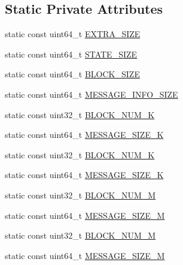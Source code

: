 \subsection*{Static Private Attributes}
\begin{DoxyCompactItemize}
\item 
static const uint64\-\_\-t \hyperlink{classapollo_1_1cyber_1_1transport_1_1ShmConf_a2b9bcde16fdd2a69d5743551584a8e1e}{E\-X\-T\-R\-A\-\_\-\-S\-I\-Z\-E}
\item 
static const uint64\-\_\-t \hyperlink{classapollo_1_1cyber_1_1transport_1_1ShmConf_ab20dfd083fe889a99460927098f29094}{S\-T\-A\-T\-E\-\_\-\-S\-I\-Z\-E}
\item 
static const uint64\-\_\-t \hyperlink{classapollo_1_1cyber_1_1transport_1_1ShmConf_a3419c1f807ee03d0c694c37446df2459}{B\-L\-O\-C\-K\-\_\-\-S\-I\-Z\-E}
\item 
static const uint64\-\_\-t \hyperlink{classapollo_1_1cyber_1_1transport_1_1ShmConf_a976f3c1b7058ef9e1b1825ec3f4af686}{M\-E\-S\-S\-A\-G\-E\-\_\-\-I\-N\-F\-O\-\_\-\-S\-I\-Z\-E}
\item 
static const uint32\-\_\-t \hyperlink{classapollo_1_1cyber_1_1transport_1_1ShmConf_a93479dbab6ae93767b39aa81a0337104}{B\-L\-O\-C\-K\-\_\-\-N\-U\-M\-\_\-K}
\item 
static const uint64\-\_\-t \hyperlink{classapollo_1_1cyber_1_1transport_1_1ShmConf_ad5198cc1f82194cbe6ca0c2d312ce00c}{M\-E\-S\-S\-A\-G\-E\-\_\-\-S\-I\-Z\-E\-\_\-K}
\item 
static const uint32\-\_\-t \hyperlink{classapollo_1_1cyber_1_1transport_1_1ShmConf_ae0d0d953ec762b93f671587ed9b42ad2}{B\-L\-O\-C\-K\-\_\-\-N\-U\-M\-\_\-K}
\item 
static const uint64\-\_\-t \hyperlink{classapollo_1_1cyber_1_1transport_1_1ShmConf_a903fdc96b5494117e7b560a2647f713b}{M\-E\-S\-S\-A\-G\-E\-\_\-\-S\-I\-Z\-E\-\_\-K}
\item 
static const uint32\-\_\-t \hyperlink{classapollo_1_1cyber_1_1transport_1_1ShmConf_a276a56b3a39ca77c6be1b98b33c3f887}{B\-L\-O\-C\-K\-\_\-\-N\-U\-M\-\_\-M}
\item 
static const uint64\-\_\-t \hyperlink{classapollo_1_1cyber_1_1transport_1_1ShmConf_a05d1a137057555170052948efe97ff2a}{M\-E\-S\-S\-A\-G\-E\-\_\-\-S\-I\-Z\-E\-\_\-M}
\item 
static const uint32\-\_\-t \hyperlink{classapollo_1_1cyber_1_1transport_1_1ShmConf_a4e0578e227b40a5961a2789123f379a5}{B\-L\-O\-C\-K\-\_\-\-N\-U\-M\-\_\-M}
\item 
static const uint64\-\_\-t \hyperlink{classapollo_1_1cyber_1_1transport_1_1ShmConf_a42b60ccbff62c41dfc6f4745cbef7fdf}{M\-E\-S\-S\-A\-G\-E\-\_\-\-S\-I\-Z\-E\-\_\-M}

\end{DoxyCompactItemize}
